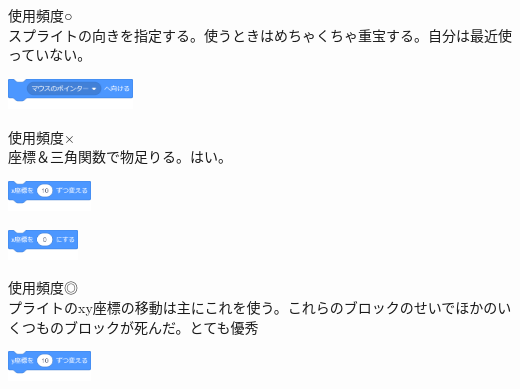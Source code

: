 \documentclass[b5paper,10pt]{jsarticle}
\begin{document}
\begin{multicols*}{3}
\begin{itembox}{7}
\end{itembox}
使用頻度○\\
スプライトの向きを指定する。使うときはめちゃくちゃ重宝する。自分は最近使っていない。
\begin{itembox}{8}
\includegraphics[height=8mm]{images/motion_9.png}
\end{itembox}
使用頻度×\\
座標＆三角関数で物足りる。はい。
\begin{itembox}{9}
\includegraphics[height=8mm]{images/motion_10.png}

\includegraphics[height=8mm]{images/motion_11.png}
\end{itembox}
使用頻度◎\\
プライトのxy座標の移動は主にこれを使う。これらのブロックのせいでほかのいくつものブロックが死んだ。とても優秀
\begin{itembox}{10}
\includegraphics[height=8mm]{images/motion_12.png}


\end{itembox}
\end{multicols*}
\end{document}
